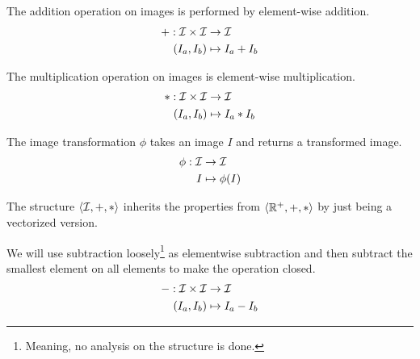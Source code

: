 \begin{definition}
 \label{def:image_addition}
  The addition operation on images is performed by element-wise
  addition.
  \begin{equation}
    \begin{split}
      + : \mathcal{I} \times \mathcal{I} &\rightarrow \mathcal{I}\\
      (I_a,I_b) &\mapsto I_a+I_b
    \end{split}
  \end{equation}
\end{definition}

\begin{definition}
 \label{def:image_multiplication}
  The multiplication operation on images is element-wise
  multiplication.
  \begin{equation}
    \begin{split}
      * : \mathcal{I} \times \mathcal{I} &\rightarrow \mathcal{I}\\
      (I_a,I_b) &\mapsto I_a*I_b
    \end{split}
  \end{equation}
\end{definition}

\begin{definition}
\label{def:image_transform}
  The image transformation $\phi$ takes an image $I$ and returns a
  transformed image.
  \begin{equation}
    \begin{split}
      \phi : \mathcal{I} &\rightarrow \mathcal{I}\\
      I &\mapsto \phi(I)
    \end{split}
  \end{equation}
\end{definition}

The structure $\langle \mathcal{I},+,*\rangle$ inherits the properties from
$\langle \mathbb{R}^+,+,*\rangle$ by just being a vectorized version.

\begin{definition}
\label{def:image_subtraction}
  We will use subtraction loosely\footnote{Meaning, no analysis on the
    structure is done.} as elementwise subtraction and then subtract
  the smallest element on all elements to make the operation closed.
  \begin{equation}
    \begin{split}
      - : \mathcal{I} \times \mathcal{I} &\rightarrow \mathcal{I}\\
      (I_a,I_b) &\mapsto I_a-I_b
    \end{split}
  \end{equation}
\end{definition}

